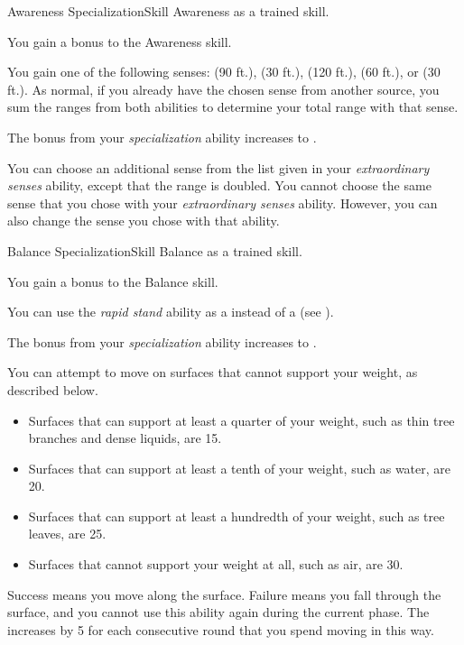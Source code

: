   \begin{feat}{Awareness Specialization}{Skill}
    \featpre Awareness as a trained skill.

     You gain a  bonus to the Awareness skill.

     You gain one of the following senses:  (90 ft.),  (30 ft.),  (120 ft.),  (60 ft.), or  (30 ft.).
    As normal, if you already have the chosen sense from another source, you sum the ranges from both abilities to determine your total range with that sense.

     The bonus from your \textit{specialization} ability increases to .

     You can choose an additional sense from the list given in your \textit{extraordinary senses} ability, except that the range is doubled.
    You cannot choose the same sense that you chose with your \textit{extraordinary senses} ability.
    However, you can also change the sense you chose with that ability.
  \end{feat}

  \begin{feat}{Balance Specialization}{Skill}
    \featpre Balance as a trained skill.

     You gain a  bonus to the Balance skill.

     You can use the \textit{rapid stand} ability as a  instead of a  (see ).

     The bonus from your \textit{specialization} ability increases to .

     You can attempt to move on surfaces that cannot support your weight, as described below.
    \begin{itemize}
      \item Surfaces that can support at least a quarter of your weight, such as thin tree branches and dense liquids, are  15.
      \item Surfaces that can support at least a tenth of your weight, such as water, are  20.
      \item Surfaces that can support at least a hundredth of your weight, such as tree leaves, are  25.
      \item Surfaces that cannot support your weight at all, such as air, are  30.
    \end{itemize}

    Success means you move along the surface.
    Failure means you fall through the surface, and you cannot use this ability again during the current phase.
    The  increases by 5 for each consecutive round that you spend moving in this way.
  \end{feat}

